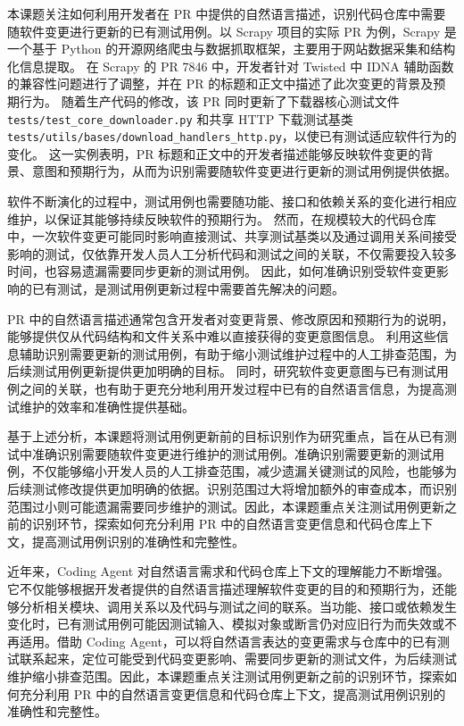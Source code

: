 本课题关注如何利用开发者在 PR 中提供的自然语言描述，识别代码仓库中需要随软件变更进行更新的已有测试用例。以 Scrapy 项目的实际 PR 为例，Scrapy 是一个基于 Python 的开源网络爬虫与数据抓取框架，主要用于网站数据采集和结构化信息提取。 在 Scrapy 的 PR 7846 中，开发者针对 Twisted 中 IDNA 辅助函数的兼容性问题进行了调整，并在 PR 的标题和正文中描述了此次变更的背景及预期行为。
随着生产代码的修改，该 PR 同时更新了下载器核心测试文件 \texttt{tests/test\_core\_downloader.py} 和共享 HTTP 下载测试基类 \texttt{tests/utils/bases/download\_handlers\_http.py}，以使已有测试适应软件行为的变化。
这一实例表明，PR 标题和正文中的开发者描述能够反映软件变更的背景、意图和预期行为，从而为识别需要随软件变更进行更新的测试用例提供依据。

软件不断演化的过程中，测试用例也需要随功能、接口和依赖关系的变化进行相应维护，以保证其能够持续反映软件的预期行为。
然而，在规模较大的代码仓库中，一次软件变更可能同时影响直接测试、共享测试基类以及通过调用关系间接受影响的测试，仅依靠开发人员人工分析代码和测试之间的关联，不仅需要投入较多时间，也容易遗漏需要同步更新的测试用例。
因此，如何准确识别受软件变更影响的已有测试，是测试用例更新过程中需要首先解决的问题。

PR 中的自然语言描述通常包含开发者对变更背景、修改原因和预期行为的说明，能够提供仅从代码结构和文件关系中难以直接获得的变更意图信息。
利用这些信息辅助识别需要更新的测试用例，有助于缩小测试维护过程中的人工排查范围，为后续测试用例更新提供更加明确的目标。
同时，研究软件变更意图与已有测试用例之间的关联，也有助于更充分地利用开发过程中已有的自然语言信息，为提高测试维护的效率和准确性提供基础。

基于上述分析，本课题将测试用例更新前的目标识别作为研究重点，旨在从已有测试中准确识别需要随软件变更进行维护的测试用例。准确识别需要更新的测试用例，不仅能够缩小开发人员的人工排查范围，减少遗漏关键测试的风险，也能够为后续测试修改提供更加明确的依据。识别范围过大将增加额外的审查成本，而识别范围过小则可能遗漏需要同步维护的测试。因此，本课题重点关注测试用例更新之前的识别环节，探索如何充分利用 PR 中的自然语言变更信息和代码仓库上下文，提高测试用例识别的准确性和完整性。

近年来，Coding Agent 对自然语言需求和代码仓库上下文的理解能力不断增强。它不仅能够根据开发者提供的自然语言描述理解软件变更的目的和预期行为，还能够分析相关模块、调用关系以及代码与测试之间的联系。当功能、接口或依赖发生变化时，已有测试用例可能因测试输入、模拟对象或断言仍对应旧行为而失效或不再适用。借助 Coding Agent，可以将自然语言表达的变更需求与仓库中的已有测试联系起来，定位可能受到代码变更影响、需要同步更新的测试文件，为后续测试维护缩小排查范围。因此，本课题重点关注测试用例更新之前的识别环节，探索如何充分利用 PR 中的自然语言变更信息和代码仓库上下文，提高测试用例识别的准确性和完整性。

